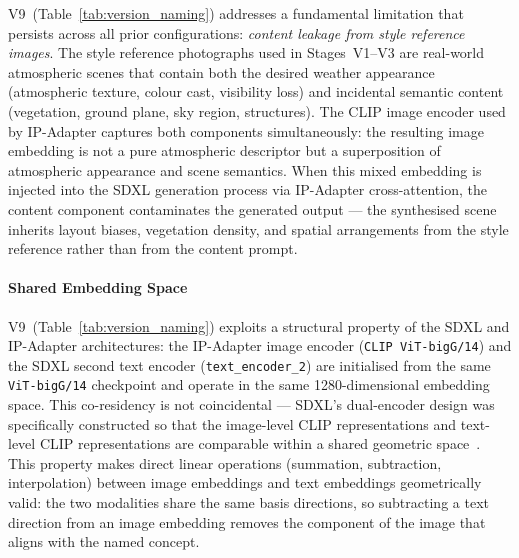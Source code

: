 \noindent V9~(Table~\ref{tab:version_naming}) addresses a fundamental limitation that persists across all prior configurations: \emph{content leakage from style reference images}. The style reference photographs used in Stages~V1--V3 are real-world atmospheric scenes that contain both the desired weather appearance (atmospheric texture, colour cast, visibility loss) and incidental semantic content (vegetation, ground plane, sky region, structures). The CLIP image encoder used by IP-Adapter captures both components simultaneously: the resulting image embedding is not a pure atmospheric descriptor but a superposition of atmospheric appearance and scene semantics. When this mixed embedding is injected into the SDXL generation process via IP-Adapter cross-attention, the content component contaminates the generated output — the synthesised scene inherits layout biases, vegetation density, and spatial arrangements from the style reference rather than from the content prompt.

\paragraph{Shared Embedding Space}
V9~(Table~\ref{tab:version_naming}) exploits a structural property of the SDXL and IP-Adapter architectures: the IP-Adapter image encoder (\texttt{CLIP ViT-bigG/14}) and the SDXL second text encoder (\texttt{text\_encoder\_2}) are initialised from the same \texttt{ViT-bigG/14} checkpoint and operate in the same 1280-dimensional embedding space. This co-residency is not coincidental — SDXL's dual-encoder design was specifically constructed so that the image-level CLIP representations and text-level CLIP representations are comparable within a shared geometric space~\cite{podell2023sdxlimprovinglatentdiffusion}. This property makes direct linear operations (summation, subtraction, interpolation) between image embeddings and text embeddings geometrically valid: the two modalities share the same basis directions, so subtracting a text direction from an image embedding removes the component of the image that aligns with the named concept.

